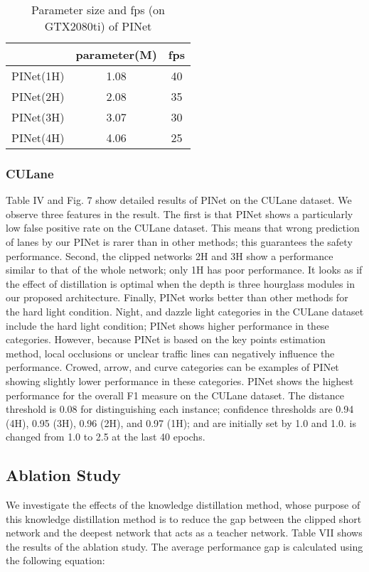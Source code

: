 \documentclass[journal]{IEEEtran}
\begin{document}
\begin{table}[ht]
    \caption{Parameter size and fps (on GTX2080ti) of PINet}
    \begin{center}
        \begin{tabular}{|c|c|c|}
            \hline
            & parameter(M) & fps\\
            \hline
            \hline
            PINet(1H) & 1.08 & 40\\
            \hline
            PINet(2H) & 2.08 & 35\\
            \hline
            PINet(3H) & 3.07 & 30\\
            \hline
            PINet(4H) & 4.06 & 25\\
            \hline
        \end{tabular}
    \end{center}
\end{table}

\subsubsection{CULane}
Table IV and Fig. 7 show detailed results of PINet on the CULane dataset. We observe three features in the result. The first is that PINet shows a particularly low false positive rate on the CULane dataset. This means that wrong prediction of lanes by our PINet is rarer than in other methods; this guarantees the safety performance. Second, the clipped networks 2H and 3H show a performance similar to that of the whole network; only 1H has poor performance. It looks as if the effect of distillation is optimal when the depth is three hourglass modules in our proposed architecture. Finally, PINet works better than other methods for the hard light condition. Night, and dazzle light categories in the CULane dataset include the hard light condition; PINet shows higher performance in these categories. However, because PINet is based on the key points estimation method, local occlusions or unclear traffic lines can negatively influence the performance. Crowed, arrow, and curve categories can be examples of PINet showing slightly lower performance in these categories. PINet shows the highest performance for the overall F1 measure on the CULane dataset. The distance threshold is 0.08 for distinguishing each instance; confidence thresholds are 0.94 (4H), 0.95 (3H), 0.96 (2H), and 0.97 (1H);  and  are initially set by 1.0 and 1.0.  is changed from 1.0 to 2.5 at the last 40 epochs.

\subsection{Ablation Study}
We investigate the effects of the knowledge distillation method, whose purpose of this knowledge distillation method is to reduce the gap between the clipped short network and the deepest network that acts as a teacher network. Table VII shows the results of the ablation study. The average performance gap is calculated using the following equation:
\end{document}
